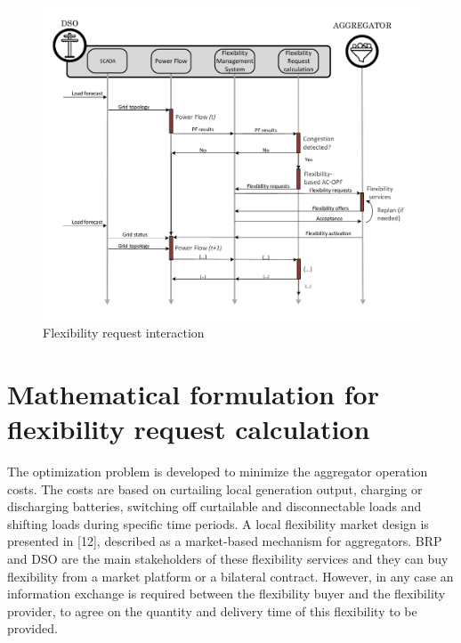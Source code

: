 \begin{figure}[h]
	\centering
	\includegraphics[width=1\columnwidth ]{ChapterOPF_DSO/Figures/OPF_interaction_ACOPF.pdf}
		\caption{Flexibility request interaction}
	\label{fig:AGG_DSO_FR}  
\end{figure}


\section{Mathematical formulation for flexibility request calculation}
The optimization problem is developed to minimize the aggregator operation costs. The costs are based on curtailing local generation output, charging or discharging batteries, switching off curtailable and disconnectable loads and shifting loads during specific time periods. A local flexibility market design is presented in [12], described as a market-based mechanism for aggregators. BRP and DSO are the main stakeholders of these flexibility services and they can buy flexibility from a market platform or a bilateral contract. However, in any case an information exchange is required between the flexibility buyer and the flexibility provider, to agree on the quantity and delivery time of this flexibility to be provided. 


